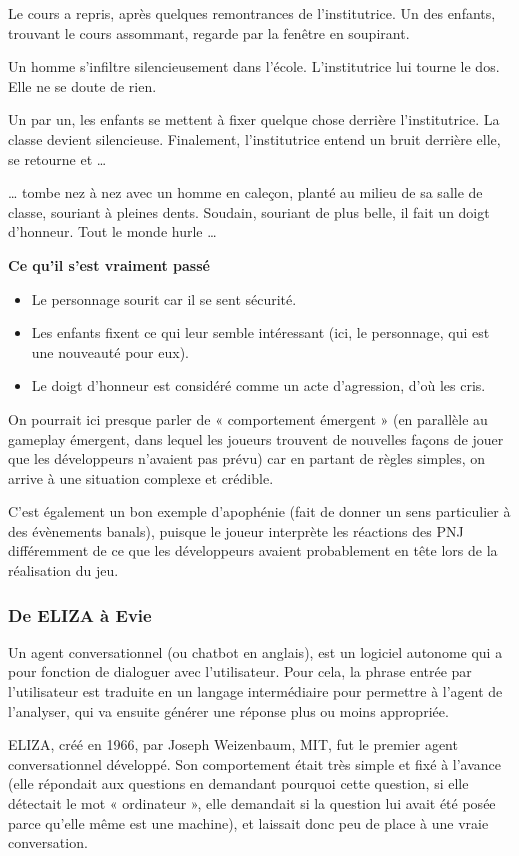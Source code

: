 \documentclass[a4paper, 12pt]{article} %
\begin{document}
Le cours a repris, après quelques remontrances de l’institutrice. Un des enfants, trouvant le cours assommant, regarde par la fenêtre en soupirant.

Un homme s’infiltre silencieusement dans l’école. L’institutrice lui tourne le dos. Elle ne se doute de rien.

Un par un, les enfants se mettent à fixer quelque chose derrière l’institutrice. La classe devient silencieuse. Finalement, l’institutrice entend un bruit derrière elle, se retourne et …

… tombe nez à nez avec un homme en caleçon, planté au milieu de sa salle de classe, souriant à pleines dents. Soudain, souriant de plus belle, il fait un doigt d’honneur. Tout le monde hurle …

\textbf{Ce qu'il s'est vraiment passé}
\begin{itemize}
	\item Le personnage sourit car il se sent sécurité.
	\item Les enfants fixent ce qui leur semble intéressant (ici, le personnage, qui est une nouveauté pour eux).
	\item Le doigt d’honneur est considéré comme un acte d’agression, d’où les cris.
\end{itemize}	

On pourrait ici presque parler de « comportement émergent » (en parallèle au gameplay émergent, dans lequel les joueurs trouvent de nouvelles façons de jouer que les développeurs n’avaient pas prévu) car en partant de règles simples, on arrive à une situation complexe et crédible.

C’est également un bon exemple d’apophénie (fait de donner un sens particulier à des évènements banals), puisque le joueur interprète les réactions des PNJ différemment de ce que les développeurs avaient probablement en tête lors de la réalisation du jeu. 

\newpage
\subsubsection{De ELIZA à Evie}

Un agent conversationnel (ou chatbot en anglais), est un logiciel autonome qui a pour fonction de dialoguer avec l’utilisateur. Pour cela, la phrase entrée par l’utilisateur est traduite en un langage intermédiaire pour permettre à l’agent de l’analyser, qui va ensuite générer une réponse plus ou moins appropriée.

ELIZA, créé en 1966, par Joseph Weizenbaum, MIT, fut le premier agent conversationnel développé. Son comportement était très simple et fixé à l'avance (elle répondait aux questions en demandant pourquoi cette question, si elle détectait le mot « ordinateur », elle demandait si la question lui avait été posée parce qu’elle même est une machine), et laissait donc peu de place à une vraie conversation.
\end{document}

